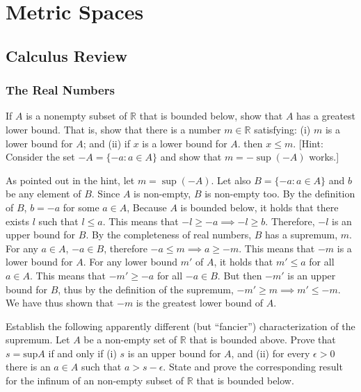 \part{Metric Spaces}

\chapter{Calculus Review}

\section{The Real Numbers}

\begin{exercise}{1}
    If $A$ is a nonempty subset of $\mathbb{R}$ that is bounded below, show that $A$ has a greatest lower bound. That is, show that there is a number $m \in \mathbb{R}$ satisfying: (i) $m$ is a lower bound for $A$; and (ii) if $x$ is a lower bound for $A$. then $x \leq m$. [Hint: Consider the set $-A = \{-a : a \in A\}$ and show that $m = -\sup(-A)$ works.]
\end{exercise}

\begin{solution}

    As pointed out in the hint, let $m = \sup(-A)$. Let also $B = \{-a: a \in A\}$ and $b$ be any element of $B$. Since $A$ is non-empty, $B$ is non-empty too. By the definition of $B$, $b = -a$ for some $a \in A$, Because $A$ is bounded below, it holds that there exists $l$ such that $l \leq a$. This means that $-l \geq -a \implies -l \geq b$. Therefore, $-l$ is an upper bound for $B$. By the completeness of real numbers, $B$ has a supremum, $m$. For any $a \in A$, $-a \in B$, therefore $-a \leq m \implies a \geq -m$. This means that $-m$ is a lower bound for $A$. For any lower bound $m'$ of $A$, it holds that $m' \leq a$ for all $a \in A$. This means that $-m' \geq -a$ for all $-a \in B$. But then $-m'$ is an upper bound for $B$, thus by the definition of the supremum, $-m' \geq m \implies m' \leq -m$. We have thus shown that $-m$ is the greatest lower bound of $A$.

    
\end{solution}

\begin{exercise}{3}
    Establish the following apparently different (but ``fancier'') characterization of the supremum. Let $A$ be a non-empty set of $\mathbb{R}$ that is bounded above. Prove that $s = \text{sup} A$ if and only if (i) $s$ is an upper bound for $A$, and (ii) for every $\epsilon > 0$ there is an $a \in A$ such that $a > s - \epsilon$. State and prove the corresponding result for the infinum of an non-empty subset of $\mathbb{R}$ that is bounded below.
\end{exercise}

